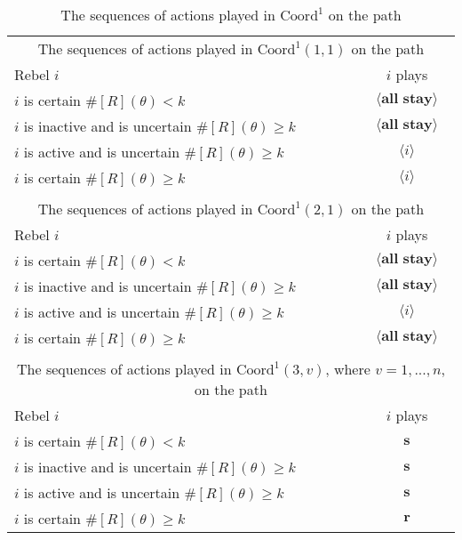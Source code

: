 \documentclass[12pt,letter]{article}
\newcommand{\Kappa}{\mathrm{Coord}}
\theoremstyle{definition}
\theoremstyle{remark}
\theoremstyle{claim}
\begin{document}
\begin{table}[!htbp]
\caption{The sequences of actions played in $\Kappa^1$ on the path}
\label{Table_cd0}
\begin{center}
\begin{tabular}{l c}
\multicolumn{2}{c}{The sequences of actions played in $\Kappa^1(1,1)$ on the path}\\
Rebel $i$ 	 	&  	$i$ plays		 \\
\hline
\hline
$i$ is certain $\#[R](\theta)<k$ 	& 	$\langle \textbf{all stay} \rangle$	\\
$i$ is inactive and is uncertain $\#[R](\theta)\geq k$	& 	$\langle \textbf{all stay} \rangle$	\\
$i$ is active and is uncertain $\#[R](\theta)\geq k$ &  $\langle i \rangle$  \\
$i$ is certain $\#[R](\theta)\geq k$ &  $\langle i \rangle$  \\
\hline
\\
\multicolumn{2}{c}{The sequences of actions played in $\Kappa^1(2,1)$ on the path}\\
Rebel $i$ 	 	&  	$i$ plays		 \\
\hline
\hline
$i$ is certain $\#[R](\theta)<k$ 	& 	$\langle \textbf{all stay} \rangle$	\\
$i$ is inactive and is uncertain $\#[R](\theta)\geq k$	& 	$\langle \textbf{all stay} \rangle$	\\
$i$ is active and is uncertain $\#[R](\theta)\geq k$ &  $\langle i \rangle$  \\
$i$ is certain $\#[R](\theta)\geq k$ &  $\langle \textbf{all stay} \rangle$  \\
\hline
\\
\multicolumn{2}{c}{The sequences of actions played in $\Kappa^1(3,v)$, where $v=1,...,n$, on the path}\\
Rebel $i$ 	 	&  	$i$ plays		 \\
\hline
\hline
$i$ is certain $\#[R](\theta)<k$ 	& 	$ \textbf{s} $	\\
$i$ is inactive and is uncertain $\#[R](\theta)\geq k$	& 	$ \textbf{s} $	\\
$i$ is active and is uncertain $\#[R](\theta)\geq k$ &  $ \textbf{s} $  \\
$i$ is certain $\#[R](\theta)\geq k$ &  $ \textbf{r} $  \\
\hline
\end{tabular}
\end{center}
\end{table}
\end{document}
